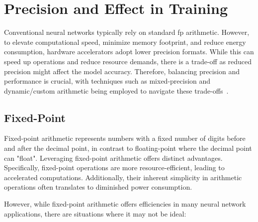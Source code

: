 \section{Precision and Effect in Training}

Conventional neural networks typically rely on standard \gls{fp} arithmetic. However, to elevate computational speed, minimize memory footprint, and reduce energy consumption, hardware accelerators adopt lower precision formats. While this can speed up operations and reduce resource demands, there is a trade-off as reduced precision might affect the model accuracy. Therefore, balancing precision and performance is crucial, with techniques such as mixed-precision and dynamic/custom arithmetic being employed to navigate these trade-offs~\cite{micikevicius2017mixed}.
\subsection{Fixed-Point}

Fixed-point arithmetic represents numbers with a fixed number of digits before and after the decimal point, in contrast to floating-point where the decimal point can "float". Leveraging fixed-point arithmetic offers distinct advantages. Specifically, fixed-point operations are more resource-efficient, leading to accelerated computations. Additionally, their inherent simplicity in arithmetic operations often translates to diminished power consumption. 


However, while fixed-point arithmetic offers efficiencies in many neural network applications, there are situations where it may not be ideal:

